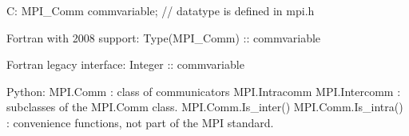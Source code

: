 C:
MPI_Comm commvariable; // datatype is defined in mpi.h

Fortran with 2008 support:
Type(MPI_Comm) :: commvariable

Fortran legacy interface:
Integer :: commvariable

Python:
MPI.Comm            : class of communicators
MPI.Intracomm
MPI.Intercomm       : subclasses of the MPI.Comm class.
MPI.Comm.Is_inter()
MPI.Comm.Is_intra() : convenience functions, not part of the MPI standard.
